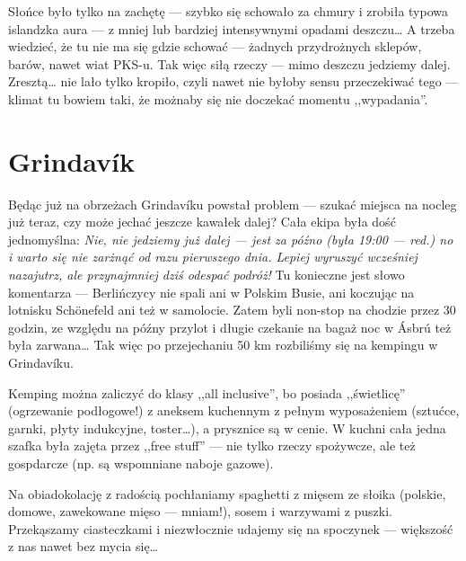 Słońce było tylko na zachętę --- szybko się schowało za chmury i zrobiła typowa islandzka aura --- z mniej lub bardziej intensywnymi opadami deszczu… A trzeba wiedzieć, że tu nie ma się gdzie schować --- żadnych przydrożnych sklepów, barów, nawet wiat PKS-u. Tak więc siłą rzeczy --- mimo deszczu jedziemy dalej. Zresztą… nie lało tylko kropiło, czyli nawet nie byłoby sensu przeczekiwać tego --- klimat tu bowiem taki, że możnaby się nie doczekać momentu ,,wypadania''.

\section*{Grindavík}

Będąc już na obrzeżach Grindavíku powstał problem --- szukać miejsca na nocleg już teraz, czy może jechać jeszcze kawałek dalej? Cała ekipa była dość jednomyślna: \emph{Nie, nie jedziemy już dalej --- jest za późno (była 19:00 --- red.) no i warto się nie zarżnąć od razu pierwszego dnia. Lepiej wyruszyć wcześniej nazajutrz, ale przynajmniej dziś odespać podróż!} Tu konieczne jest słowo komentarza --- Berlińczycy nie spali ani w Polskim Busie, ani koczując na lotnisku Schönefeld ani też w samolocie. Zatem byli non-stop na chodzie przez 30 godzin, ze względu na późny przylot i długie czekanie na bagaż noc w Ásbrú też była zarwana… Tak więc po przejechaniu 50 km rozbiliśmy się na kempingu w Grindavíku.

Kemping można zaliczyć do klasy ,,all inclusive'', bo posiada ,,świetlicę'' (ogrzewanie podłogowe!) z aneksem kuchennym z pełnym wyposażeniem (sztućce, garnki, płyty indukcyjne, toster…), a prysznice są w cenie. W kuchni cała jedna szafka była zajęta przez ,,free stuff'' --- nie tylko rzeczy spożywcze, ale też gospdarcze (np. są wspomniane naboje gazowe).



Na obiadokolację z radością pochłaniamy spaghetti z mięsem ze słoika (polskie, domowe, zawekowane mięso --- mniam!), sosem i warzywami z puszki. Przekąszamy ciasteczkami i niezwłocznie udajemy się na spoczynek --- większość z nas nawet bez mycia się…


